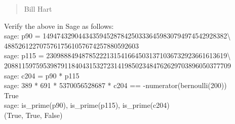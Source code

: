 \documentclass[openany]{book}
\theoremstyle{plain}
\theoremstyle{definition}
\begin{document}
{\begin{quote}
Bill Hart
\end{quote}

Verify the above in Sage as follows: \\

{\sf
sage: p90 = 1494743290443435945287842503336459830794974542928382\textbackslash\\
48852612270757617561057674257880592603\\
sage: p115 = 230988849487852221315416645031371036732923661613619\textbackslash\\
2088115975953987911840431532723141985023484762629703896050377709\\
sage: c204 = p90 * p115\\
sage: 389 * 691 * 5370056528687 * c204 == -numerator(bernoulli(200))\\
True\\
sage: is\_prime(p90), is\_prime(p115), is\_prime(c204)\\
(True, True, False)
}
}
\end{document}
